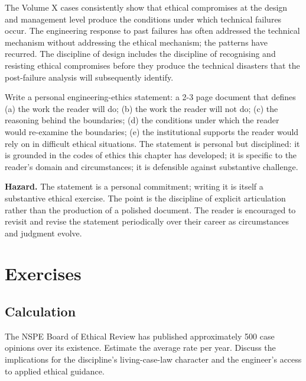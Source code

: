 \begin{principle}
The Volume X cases consistently show that ethical compromises at the design and management level produce the conditions under which technical failures occur. The engineering response to past failures has often addressed the technical mechanism without addressing the ethical mechanism; the patterns have recurred. The discipline of design includes the discipline of recognising and resisting ethical compromises before they produce the technical disasters that the post-failure analysis will subsequently identify.
\end{principle}

\begin{project}
Write a personal engineering-ethics statement: a 2-3 page document that defines (a) the work the reader will do; (b) the work the reader will not do; (c) the reasoning behind the boundaries; (d) the conditions under which the reader would re-examine the boundaries; (e) the institutional supports the reader would rely on in difficult ethical situations. The statement is personal but disciplined: it is grounded in the codes of ethics this chapter has developed; it is specific to the reader's domain and circumstances; it is defensible against substantive challenge.

\textbf{Hazard.} The statement is a personal commitment; writing it is itself a substantive ethical exercise. The point is the discipline of explicit articulation rather than the production of a polished document. The reader is encouraged to revisit and revise the statement periodically over their career as circumstances and judgment evolve.
\end{project}

\section{Exercises}

\subsection*{Calculation}

\begin{exercise}
The NSPE Board of Ethical Review has published approximately 500 case opinions over its existence. Estimate the average rate per year. Discuss the implications for the discipline's living-case-law character and the engineer's access to applied ethical guidance.
\end{exercise}

